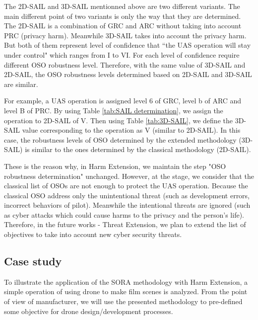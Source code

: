 \documentclass[a4paper, 10, conference]{ieeeconf}  %
\begin{document}
The 2D-SAIL and 3D-SAIL mentionned above are two different variants. The main different point of two variants is only the way that they are determined. The 2D-SAIL is a combination of GRC and ARC without taking into account PRC (privacy harm). Meanwhile 3D-SAIL takes into account the privacy harm. But both of them represent level of confidence that ``the UAS operation will stay under control" which ranges from I to VI. For each level of confidence require different OSO robustness level. Therefore, with the same value of 3D-SAIL and 2D-SAIL, the OSO robustness levels determined based on 2D-SAIL and 3D-SAIL are similar.

For example, a UAS operation is assigned level 6 of GRC, level b of ARC and level B of PRC. By using Table \ref{tab:SAIL determination}, we assign the operation to 2D-SAIL of V. Then using Table \ref{tab:3D-SAIL}, we define the 3D-SAIL value corresponding to the operation as V (similar to 2D-SAIL). In this case, the robustness levels of OSO determined by the extended methodology (3D-SAIL) is similar to the ones determined by the classical methodology (2D-SAIL). 

These is the reason why, in Harm Extension, we maintain the step "OSO robustness determination" unchanged. However, at the stage, we consider that the classical list of OSOs are not enough to protect the UAS operation. Because the classical OSO address only the unintentional threat (such as development errors, incorrect behaviors of pilot). Meanwhile the intentional threats are ignored (such as cyber attacks which could cause harms to the privacy and the person's life). Therefore, in the future works - Threat Extension, we plan to extend the list of objectives to take into account new cyber security threats.

\subsection{Case study} \label{sec:cas}

To illustrate the application of the SORA methodology with Harm Extension, a simple operation of using drone to make film scenes is analyzed. From the point of view of manufacturer, we will use the presented methodology to pre-defined some objective for drone design/development processes.
\end{document}
